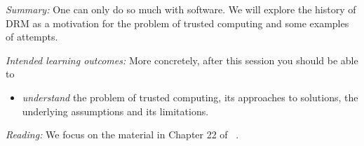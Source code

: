 \emph{Summary:}
One can only do so much with software.
We will explore the history of \ac{DRM} as a motivation for the problem of 
trusted computing and some examples of attempts.

\emph{Intended learning outcomes:}
More concretely, after this session you should be able to
\begin{itemize}
  \item \emph{understand} the problem of trusted computing, its approaches to 
    solutions, the underlying assumptions and its limitations.
\end{itemize}

\emph{Reading:}
We focus on the material in Chapter 22 of 
~\cite{Anderson2008sea}.

